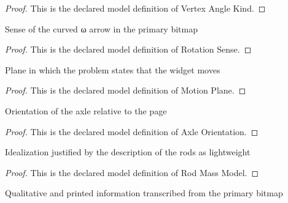 \begin{proof}
  This is the declared model definition of Vertex Angle Kind.
\end{proof}
\begin{definition}
  \label{def:physics:phyx-mini-0698:phyxminiproblems-problemphyxmini0698-rotationsense}
  Sense of the curved ω arrow in the primary bitmap
\end{definition}
\begin{proof}
  This is the declared model definition of Rotation Sense.
\end{proof}
\begin{definition}
  \label{def:physics:phyx-mini-0698:phyxminiproblems-problemphyxmini0698-motionplane}
  Plane in which the problem states that the widget moves
\end{definition}
\begin{proof}
  This is the declared model definition of Motion Plane.
\end{proof}
\begin{definition}
  \label{def:physics:phyx-mini-0698:phyxminiproblems-problemphyxmini0698-axleorientation}
  Orientation of the axle relative to the page
\end{definition}
\begin{proof}
  This is the declared model definition of Axle Orientation.
\end{proof}
\begin{definition}
  \label{def:physics:phyx-mini-0698:phyxminiproblems-problemphyxmini0698-rodmassmodel}
  Idealization justified by the description of the rods as lightweight
\end{definition}
\begin{proof}
  This is the declared model definition of Rod Mass Model.
\end{proof}
\begin{definition}
  \label{def:physics:phyx-mini-0698:phyxminiproblems-problemphyxmini0698-triangularwidgetfigure}
  Qualitative and printed information transcribed from the primary bitmap
\end{definition}
